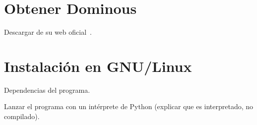 

\section{Obtener Dominous}


Descargar de su web oficial~\cite{website:dominous}.

\section{Instalación en GNU/Linux}

Dependencias del programa.

Lanzar el programa con un intérprete de Python (explicar que es interpretado, no compilado).

